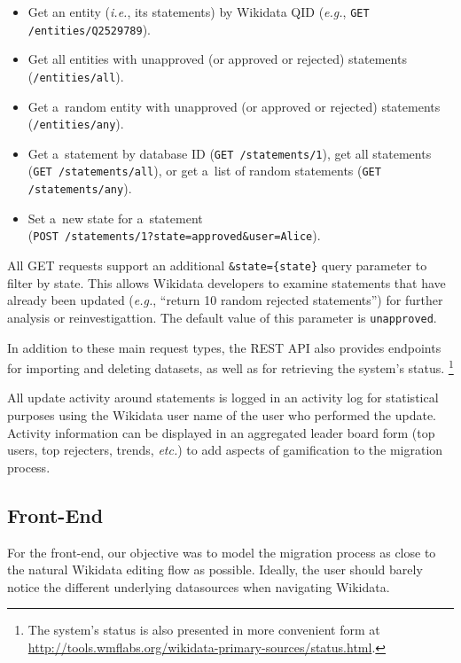 \documentclass{sig-alternate-2013}
\begin{document}
\begin{itemize}
  \setlength\itemsep{0em}
  \item Get an entity (\emph{i.e.}, its statements) by Wikidata QID
  (\emph{e.g.}, \verb|GET /entities/Q2529789|).
  \item Get all entities with unapproved (or approved or rejected) statements
  (\verb|/entities/all|).
  \item Get a~random entity with unapproved (or approved or rejected) statements
  (\verb|/entities/any|).
  \item Get a~statement by database ID (\verb|GET /statements/1|), get all
    statements (\verb|GET /statements/all|), or get a~list of
  random statements (\verb|GET /statements/any|).
  \item Set a~new state for a~statement \\(\verb|POST /statements/1?state=approved&user=Alice|).
\end{itemize}

All GET requests support an additional \verb|&state={state}| query parameter to filter by state.
This allows Wikidata developers to examine statements
that have already been updated (\emph{e.g.}, ``return 10 random rejected statements'')
for further analysis or reinvestigattion.
The default value of this parameter is \verb|unapproved|.

In addition to these main request types, the REST API also provides endpoints
for importing and deleting datasets, as well as for retrieving the system's status.%
\footnote{The system's status is also presented in more convenient form at
\url{http://tools.wmflabs.org/wikidata-primary-sources/status.html}.}

All update activity around statements is logged in an activity log
for statistical purposes using the Wikidata user name of the user who performed the update.
Activity information can be displayed in an aggregated leader board form
(top users, top rejecters, trends, \emph{etc.}) to add aspects of gamification to the migration process.

\subsection{Front-End}

For the front-end, our objective was to model the migration process
as close to the natural Wikidata editing flow as possible.
Ideally, the user should barely notice the different underlying datasources
when navigating Wikidata.
\end{document}
